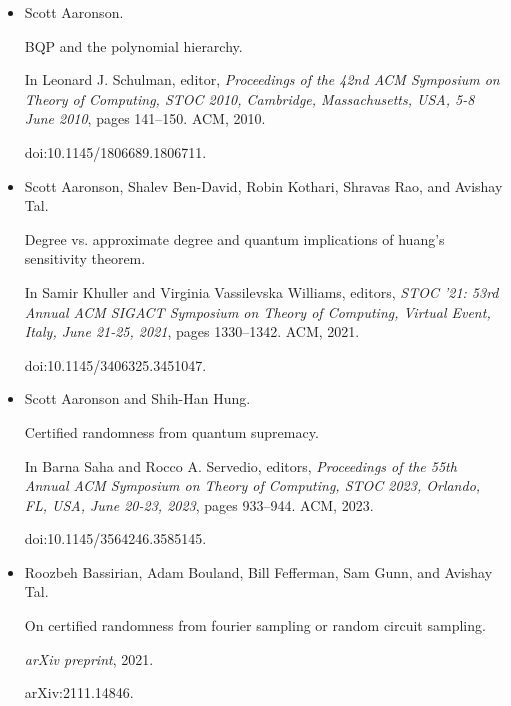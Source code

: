 \documentclass[10pt,a4paper]{article}
\begin{document}
\begin{itemize}


\item[] 
[1]

Scott Aaronson.


BQP and the polynomial hierarchy.


In Leonard J. Schulman, editor, \emph{Proceedings of the 42nd ACM
Symposium on Theory of Computing, STOC 2010, Cambridge, Massachusetts, USA,
5-8 June 2010}, pages 141–150. ACM, 2010.


doi:10.1145/1806689.1806711.





\item[] 
[2]

Scott Aaronson, Shalev Ben-David, Robin Kothari, Shravas Rao, and Avishay
Tal.


Degree vs. approximate degree and quantum implications of huang’s
sensitivity theorem.


In Samir Khuller and Virginia Vassilevska Williams, editors, \emph{STOC ’21: 53rd Annual ACM SIGACT Symposium on Theory of Computing,
Virtual Event, Italy, June 21-25, 2021}, pages 1330–1342. ACM, 2021.


doi:10.1145/3406325.3451047.





\item[] 
[3]

Scott Aaronson and Shih-Han Hung.


Certified randomness from quantum supremacy.


In Barna Saha and Rocco A. Servedio, editors, \emph{Proceedings of the
55th Annual ACM Symposium on Theory of Computing, STOC 2023, Orlando, FL,
USA, June 20-23, 2023}, pages 933–944. ACM, 2023.


doi:10.1145/3564246.3585145.





\item[] 
[4]

Roozbeh Bassirian, Adam Bouland, Bill Fefferman, Sam Gunn, and Avishay Tal.


On certified randomness from fourier sampling or random circuit
sampling.


\emph{arXiv preprint}, 2021.


arXiv:2111.14846.






\end{itemize}
\end{document}
